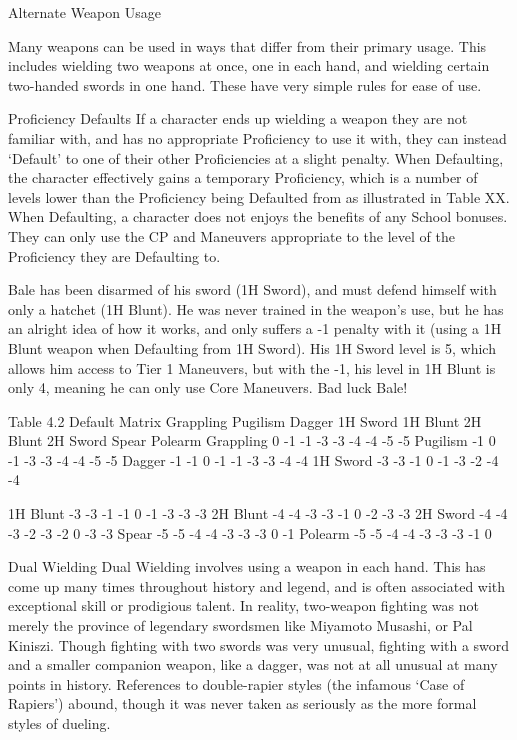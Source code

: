 \documentclass[oneside,11pt,english]{book}
\begin{document}
Alternate Weapon Usage 

 

Many weapons can be used in ways that differ from their primary usage. This includes wielding two 
weapons at once, one in each hand, and wielding certain two-handed swords in one hand. These have very 
simple rules for ease of use. 

 

Proficiency Defaults 
If a character ends up wielding a weapon they are not familiar with, and has no appropriate Proficiency to 
use it with, they can instead ‘Default’ to one of their other Proficiencies at a slight penalty. When 
Defaulting, the character effectively gains a temporary Proficiency, which is a number of levels lower 
than the Proficiency being Defaulted from as illustrated in Table XX. When Defaulting, a character does 
not enjoys the benefits of any School bonuses. They can only use the CP and Maneuvers appropriate to 
the level of the Proficiency they are Defaulting to. 

 

Bale has been disarmed of his sword (1H Sword), and must defend himself with only a hatchet (1H 
Blunt). He was never trained in the weapon’s use, but he has an alright idea of how it works, and only 
suffers a -1 penalty with it (using a 1H Blunt weapon when Defaulting from 1H Sword). His 1H Sword 
level is 5, which allows him access to Tier 1 Maneuvers, but with the -1, his level in 1H Blunt is only 4, 
meaning he can only use Core Maneuvers. Bad luck Bale! 

 
Table 4.2 Default Matrix 
 Grappling Pugilism Dagger 1H Sword 1H Blunt 2H Blunt 2H Sword Spear Polearm 
Grappling 0 -1 -1 -3 -3 -4 -4 -5 -5 
Pugilism -1 0 -1 -3 -3 -4 -4 -5 -5 
Dagger -1 -1 0 -1 -1 -3 -3 -4 -4 
1H Sword -3 -3 -1 0 -1 -3 -2 -4 -4 


1H Blunt -3 -3 -1 -1 0 -1 -3 -3 -3 
2H Blunt -4 -4 -3 -3 -1 0 -2 -3 -3 
2H Sword -4 -4 -3 -2 -3 -2 0 -3 -3 
Spear -5 -5 -4 -4 -3 -3 -3 0 -1 
Polearm -5 -5 -4 -4 -3 -3 -3 -1 0 

 

Dual Wielding 
Dual Wielding involves using a weapon in each hand. This has come up many times throughout history 
and legend, and is often associated with exceptional skill or prodigious talent. In reality, two-weapon 
fighting was not merely the province of legendary swordsmen like Miyamoto Musashi, or Pal Kiniszi. 
Though fighting with two swords was very unusual, fighting with a sword and a smaller companion 
weapon, like a dagger, was not at all unusual at many points in history. References to double-rapier styles 
(the infamous ‘Case of Rapiers’) abound, though it was never taken as seriously as the more formal styles 
of dueling. 
\end{document}
